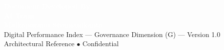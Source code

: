 \documentclass[11pt,a4paper]{article}
\begin{document}
\vspace{1cm}
\begin{tcolorbox}[enhanced, colback=dpiblue, colframe=dpiblue, boxrule=0pt, arc=2mm]
\begin{center}
\textcolor{white}{\textbf{\Large Document Developed By}}\\[0.15cm]
\textcolor{white}{\textbf{\Large AI Team}}\\[0.15cm]
\textcolor{white}{\textbf{\Large Malkapurapu Sivamanikanta}}\\[0.3cm]
\textcolor{dpicloud}{\small Digital Performance Index --- Governance Dimension (G) --- Version 1.0}\\[0.1cm]
\textcolor{dpicloud}{\small Architectural Reference $\bullet$ Confidential}
\end{center}
\end{tcolorbox}
\end{document}
